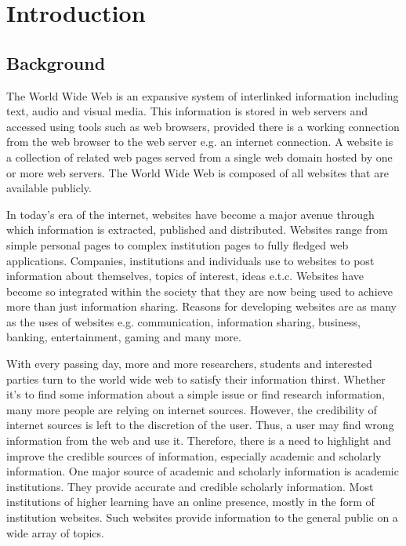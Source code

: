 \chapter{Introduction}
\section{Background}

\noindent
The World Wide Web is an expansive system of interlinked information including text, audio and visual media. This information is stored in web servers and accessed using tools such as web browsers, provided there is a working connection from the web browser to the web server e.g. an internet connection. A website is a collection of related web pages served from a single web domain hosted by one or more web servers. The World Wide Web is composed of all websites that are available publicly.

\noindent
In today's era of the internet, websites have become a major avenue through which information is extracted, published and distributed. Websites range from simple personal pages to complex institution pages to fully fledged web applications. Companies, institutions and individuals use to websites to post information about themselves, topics of interest, ideas e.t.c. Websites have become so integrated within the society that they are now being used to achieve more than just information sharing. Reasons for developing websites are as many as the uses of websites e.g. communication, information sharing, business, banking, entertainment, gaming and many more.

\noindent
With every passing day, more and more researchers, students and interested parties turn to the world wide web to satisfy their information thirst. Whether it's to find some information about a simple issue or find research information, many more people are relying on internet sources. However, the credibility of internet sources is left to the discretion of the user. Thus, a user may find wrong information from the web and use it. Therefore, there is a need to highlight and improve the credible sources of information, especially academic and scholarly information. One major source of academic and scholarly information is academic institutions. They provide accurate and credible scholarly information. Most institutions of higher learning have an online presence, mostly in the form of institution websites. Such websites provide information to the general public on a wide array of topics.


